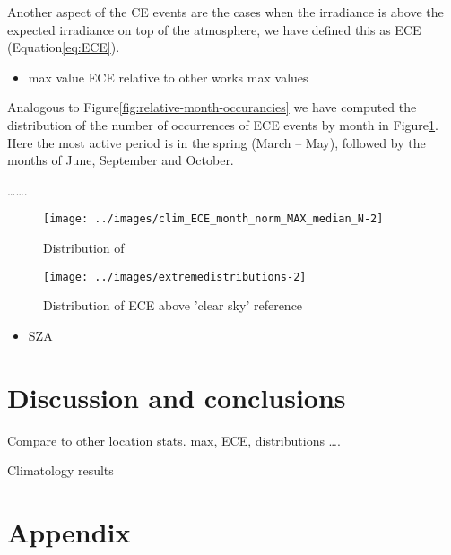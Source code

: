 \documentclass[
]{article}
\providecommand{\tightlist}{%
  \setlength{\itemsep}{0pt}\setlength{\parskip}{0pt}}
\begin{document}
Another aspect of the CE events are the cases when the irradiance is above the
expected irradiance on top of the atmosphere, we have defined this as ECE
(Equation\nobreakspace{}\ref{eq:ECE}).

\begin{itemize}
\tightlist
\item
  max value ECE
  relative to other works max values
\end{itemize}

Analogous to Figure\nobreakspace{}\ref{fig:relative-month-occurancies} we have
computed the distribution of the number of occurrences of ECE events by month in
Figure\nobreakspace{}\ref{fig:relative-month-occurancies-ECE}. Here the most active
period is in the spring (March -- May), followed by the months of June, September and
October.

\ldots\ldots.

\begin{figure}[h!]

{\centering \texttt{[image: ../images/clim\_ECE\_month\_norm\_MAX\_median\_N-2]} 

}

\caption{Distribution of }\label{fig:relative-month-occurancies-ECE}
\end{figure}

\begin{figure}[h!]

{\centering \texttt{[image: ../images/extremedistributions-2]} 

}

\caption{Distribution of ECE above 'clear sky' reference}\label{fig:unnamed-chunk-4}
\end{figure}

\begin{itemize}
\tightlist
\item
  SZA
\end{itemize}

\FloatBarrier

\hypertarget{discussion-and-conclusions}{%
\section{Discussion and conclusions}\label{discussion-and-conclusions}}

Compare to other location stats.
max, ECE, distributions \ldots.

Climatology results

\hypertarget{appendix}{%
\section*{Appendix}\label{appendix}}
\end{document}
